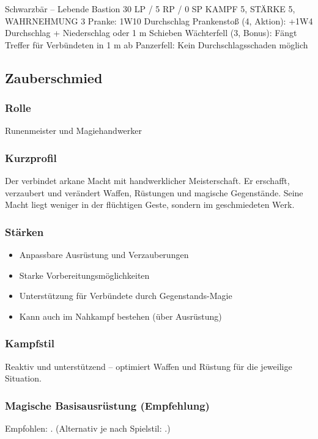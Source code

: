 \medskip

\creatureblock
{Schwarzbär – Lebende Bastion}
{30 LP / 5 RP / 0 SP}
{KAMPF 5, STÄRKE 5, WAHRNEHMUNG 3}
{%
	Pranke: 1W10 Durchschlag \newline
	Prankenstoß (4, Aktion): +1W4 Durchschlag + Niederschlag oder 1 m Schieben \newline
	Wächterfell (3, Bonus): Fängt Treffer für Verbündeten in 1 m ab
}
{Panzerfell: Kein Durchschlagsschaden möglich}

\subsection{Zauberschmied}

\subsubsection*{Rolle}
Runenmeister und Magiehandwerker

\subsubsection*{Kurzprofil}
Der  verbindet arkane Macht mit handwerklicher Meisterschaft.
Er erschafft, verzaubert und verändert Waffen, Rüstungen und magische Gegenstände.
Seine Macht liegt weniger in der flüchtigen Geste, sondern im geschmiedeten Werk.

\subsubsection*{Stärken}
\begin{itemize}
	\item Anpassbare Ausrüstung und Verzauberungen
	\item Starke Vorbereitungsmöglichkeiten
	\item Unterstützung für Verbündete durch Gegenstands-Magie
	\item Kann auch im Nahkampf bestehen (über Ausrüstung)
\end{itemize}

\subsubsection*{Kampfstil}
Reaktiv und unterstützend – optimiert Waffen und Rüstung für die jeweilige Situation.

\subsubsection*{Magische Basisausrüstung (Empfehlung)}
Empfohlen: .  
(Alternativ je nach Spielstil: .)

